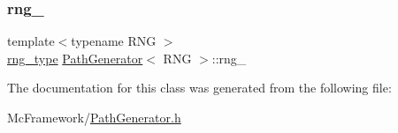 \hypertarget{class_path_generator_a4fad0001eee9b8185049f3c860f53b1f}{}\label{class_path_generator_a4fad0001eee9b8185049f3c860f53b1f} 
\subsubsection{\texorpdfstring{rng\+\_\+}{rng\_}}
{\footnotesize\ttfamily template$<$typename R\+NG $>$ \\
\hyperlink{class_path_generator_a519a5baf42ff4c7c1addc9a4f2826b12}{rng\+\_\+type} \hyperlink{class_path_generator}{Path\+Generator}$<$ R\+NG $>$\+::rng\+\_\+\hspace{0.3cm}{\ttfamily [private]}}



The documentation for this class was generated from the following file\+:\begin{DoxyCompactItemize}
\item 
Mc\+Framework/\hyperlink{_path_generator_8h}{Path\+Generator.\+h}\end{DoxyCompactItemize}
